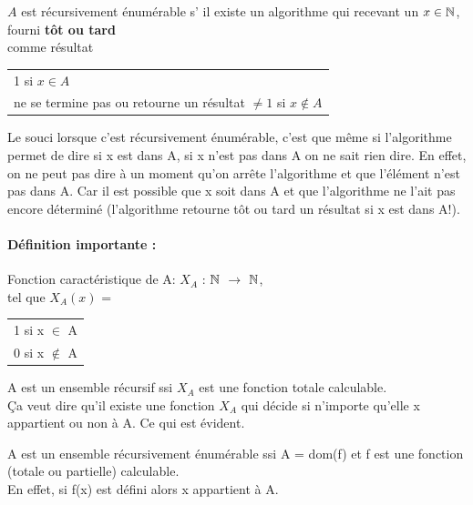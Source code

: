 \begin{mydef}
	$A$ est récursivement énumérable s’ il existe un algorithme qui recevant
	un $x\in \mathbb{N}$, fourni \textbf{tôt ou tard} \\
	comme résultat
	\begin{tabular}{l}
		1 si $x\in A$\\
		 ne se termine pas ou retourne un résultat $\neq1$ si
		 $x\notin A$\\
	\end{tabular}
\end{mydef}

\begin{myrem}
	Le souci lorsque c'est récursivement énumérable,
	c'est que même si l'algorithme permet de dire si x est dans A, si x
	n'est pas dans A on ne sait rien dire. En effet, on ne peut pas dire à un moment qu'on
	arrête l'algorithme et que l'élément n'est pas dans A.
       	Car il est possible que x soit dans A et que l'algorithme ne
	l'ait pas encore déterminé (l'algorithme retourne tôt ou tard un
	résultat si x est dans A!).
\end{myrem}

\paragraph{Définition importante :}
\label{par:d_finition_importante}

\begin{mydef}
	Fonction caractéristique de A:
	$X_A$ : $\mathbb{N}$ $\rightarrow$ $\mathbb{N}$, \\
	tel que $X_A(x)$ =
	\begin{tabular}{l}
		1 si x $\in$ A \\	
		0 si x $\notin$ A 
	\end{tabular}
\end{mydef}

\begin{myprop}
	A est un ensemble récursif ssi $X_A$ est une fonction totale
	calculable. \\ 
	Ça veut dire qu'il existe une fonction $X_A$ qui décide si n'importe
	qu'elle x appartient ou non à A. Ce qui est évident.
\end{myprop}

\begin{myprop}
	A est un ensemble récursivement énumérable ssi A = dom(f) et f est une 
	fonction (totale ou partielle) calculable.\\
       	En effet, si f(x) est défini alors
	x appartient à A.
\end{myprop}


